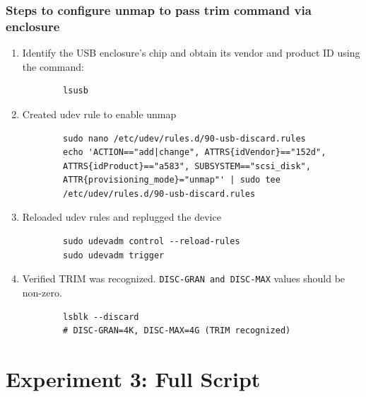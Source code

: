 \subsubsection*{Steps to configure unmap to pass trim command via enclosure}
\begin{enumerate}
    \item Identify the USB enclosure's chip and obtain its vendor and product ID using the command:
        \begin{verbatim}
        lsusb
        \end{verbatim}

    \item Created udev rule to enable unmap
        \begin{verbatim}
        sudo nano /etc/udev/rules.d/90-usb-discard.rules
        echo 'ACTION=="add|change", ATTRS{idVendor}=="152d", 
        ATTRS{idProduct}=="a583", SUBSYSTEM=="scsi_disk", 
        ATTR{provisioning_mode}="unmap"' | sudo tee 
        /etc/udev/rules.d/90-usb-discard.rules
        \end{verbatim}

    \item Reloaded udev rules and replugged the device
        \begin{verbatim}
        sudo udevadm control --reload-rules
        sudo udevadm trigger
        \end{verbatim}

    \item Verified TRIM was recognized. \texttt{DISC-GRAN and DISC-MAX} values should be non-zero. 
        \begin{verbatim}
        lsblk --discard
        # DISC-GRAN=4K, DISC-MAX=4G (TRIM recognized)
        \end{verbatim}

\end{enumerate}

\section{Experiment 3: Full Script}

